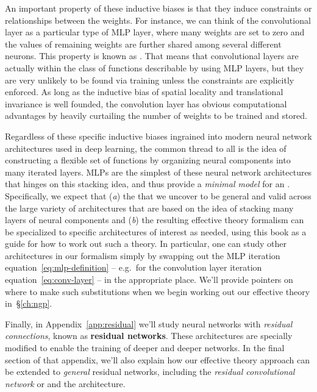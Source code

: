\ei
An important property of these inductive biases is that they induce constraints or relationships between the weights. For instance, we can think of the convolutional layer as a particular type of MLP layer, where many weights are set to zero and the values of remaining weights are further shared among several different neurons. This property is known as . That means that convolutional layers are actually within the class of functions describable by using MLP layers, but they are very unlikely to be found via training unless the constraints are explicitly enforced. As long as the inductive bias of spatial locality and translational invariance is well founded, the convolution layer
has obvious computational advantages by heavily curtailing the number of weights to be trained and stored.

Regardless of these specific inductive biases ingrained into modern neural network architectures used in deep learning, the common thread to all is the idea of constructing a flexible set of functions by organizing neural components into many iterated layers. MLPs are the simplest of these neural network architectures that hinges on this stacking idea, and thus provide a \emph{minimal model} for an .
Specifically, we expect that (\textit{a}) the  that we uncover to be general and valid across the large variety of architectures that are based on the idea of stacking many layers of neural components and (\textit{b}) the resulting effective theory formalism can be specialized to specific architectures of interest as needed, using this book as a guide for how to work out such a theory. In particular, one can study other architectures in our formalism simply by swapping out the MLP iteration equation~\eqref{eq:mlp-definition} -- e.g.~for the convolution layer iteration equation~\eqref{eq:conv-layer} --  in the appropriate place. We'll provide pointers on where to make such substitutions when we begin working out our effective theory in~\S\ref{ch:ngp}. 

Finally, in Appendix~\ref{app:residual} we'll study neural networks with \emph{residual connections}, known as \textbf{residual networks}. These architectures are specially modified to enable the training of deeper and deeper networks. In the final section of that appendix, we'll also explain how our effective theory approach can be extended to \emph{general} residual networks, including the \emph{residual convolutional network} or  and the  architecture.


